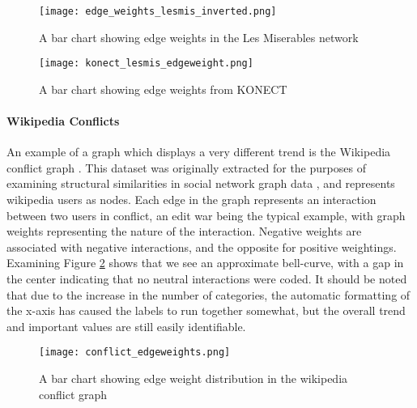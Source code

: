 \begin{figure}
	\centering
	\begin{minipage}{0.45\textwidth}
		\centering
		\texttt{[image: edge\_weights\_lesmis\_inverted.png]}
		\caption{A bar chart showing edge weights in the Les Miserables network}
		\label{fig:edgeweightslesmis}
	\end{minipage}\hfill
	\begin{minipage}{0.45\textwidth}
		\centering
		\texttt{[image: konect\_lesmis\_edgeweight.png]}
		\caption{A bar chart showing edge weights from KONECT}
		\label{fig:edgeweightskonect}
	\end{minipage}
\end{figure}

\paragraph{Wikipedia Conflicts}
An example of a graph which displays a very different trend is the Wikipedia conflict graph \cite{konect:2014:wikiconflict}. This dataset was originally extracted for the purposes of examining structural similarities in social network graph data \cite{konect:brandes09}, and represents wikipedia users as nodes. Each edge in the graph represents an interaction between two users in conflict, an edit war being the typical example, with graph weights representing the nature of the interaction. Negative weights are associated with negative interactions, and the opposite for positive weightings. Examining Figure \ref{fig:wiki_conf} shows that we see an approximate bell-curve, with a gap in the center indicating that no neutral interactions were coded. It should be noted that due to the increase in the number of categories, the automatic formatting of the x-axis has caused the labels to run together somewhat, but the overall trend and important values are still easily identifiable. 

\begin{figure}
	\centering
	\texttt{[image: conflict\_edgeweights.png]}
	\caption{A bar chart showing edge weight distribution in the wikipedia conflict graph}
	\label{fig:wiki_conf}
\end{figure}

